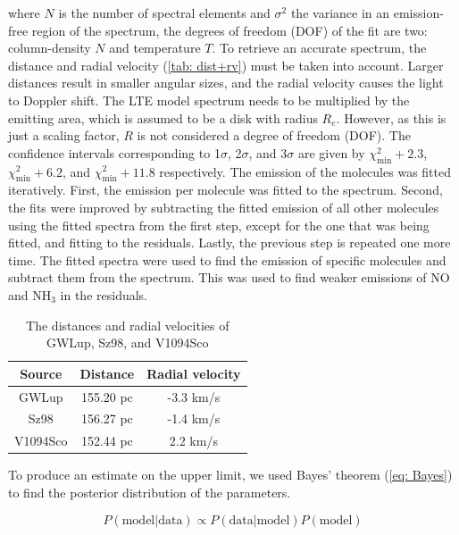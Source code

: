 \documentclass[oneside, single, authoryear, semicolon, 12pt]{lion-msc}
\newcommand{\4}{$_4$}
\newcommand{\3}{$_3$}
\newcommand{\2}{$_2$}
\begin{document}
where $N$ is the number of spectral elements and $\sigma^2$ the variance in an emission-free region of the spectrum, the degrees of freedom (DOF) of the fit are two: column-density $N$ and temperature $T$. To retrieve an accurate spectrum, the distance and radial velocity (\autoref{tab: dist+rv}) must be taken into account. Larger distances result in smaller angular sizes, and the radial velocity causes the light to Doppler shift. The LTE model spectrum needs to be multiplied by the emitting area, which is assumed to be a disk with radius $R_e$. However, as this is just a scaling factor, $R$ is not considered a degree of freedom (DOF). The confidence intervals corresponding to 1$\sigma$, 2$\sigma$, and 3$\sigma$ are given by $\chi^2_{\mathrm{min}}+2.3$, $\chi^2_{\mathrm{min}}+6.2$, and $\chi^2_{\mathrm{min}}+11.8$ respectively. The emission of the molecules was fitted iteratively. First, the emission per molecule was fitted to the spectrum. Second, the fits were improved by subtracting the fitted emission of all other molecules using the fitted spectra from the first step, except for the one that was being fitted, and fitting to the residuals. Lastly, the previous step is repeated one more time. 
The fitted spectra were used to find the emission of specific molecules and subtract them from the spectrum. This was used to find weaker emissions of NO and NH\3 in the residuals. 

\begin{table}[H]
\centering
\begin{tabular}{ccc}
\hline
Source   & \makecell{Distance \\\citep{henning2024mindsjwstmirimidinfrared}}  & \makecell{Radial velocity \\ \citep{Frasca_2017}} \\ \hline
GWLup    & 155.20 pc & -3.3 km/s       \\
Sz98     & 156.27 pc & -1.4 km/s       \\
V1094Sco & 152.44 pc & 2.2 km/s        \\ \hline
\end{tabular}
\caption{The distances and radial velocities of GWLup, Sz98, and V1094Sco}
\label{tab: dist+rv}
\end{table}

To produce an estimate on the upper limit, we used Bayes' theorem (\autoref{eq: Bayes}) to find the posterior distribution of the parameters. 

\begin{equation}
    P(\mathrm{model}|\mathrm{data})\propto P(\mathrm{data}|\mathrm{model})P(\mathrm{model})
    \label{eq: Bayes}
\end{equation}
\end{document}
